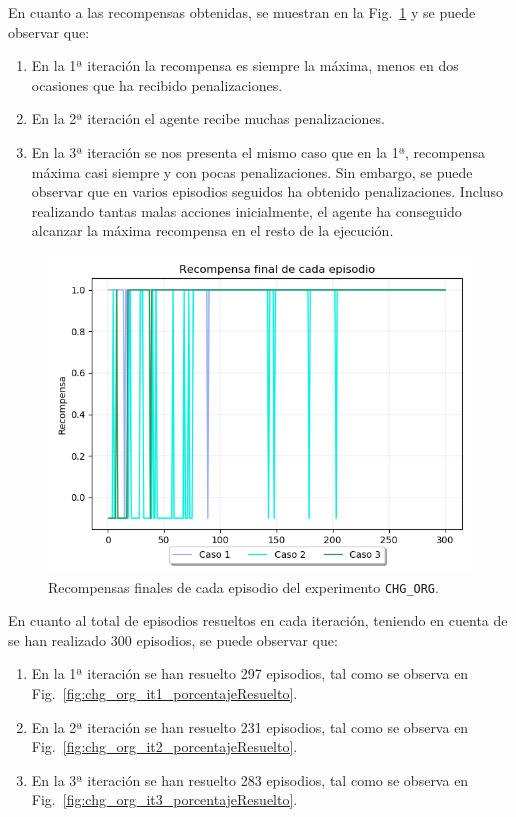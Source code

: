 En cuanto a las recompensas obtenidas, se muestran en la Fig.~\ref{fig:CHANGE_ORIGIN-20-09_00-42-50_recompensa} y se puede observar que: 
\begin{enumerate}
    \item En la 1ª iteración la recompensa es siempre la máxima, menos en dos ocasiones que ha recibido penalizaciones.  
    \item En la 2ª iteración el agente recibe muchas penalizaciones.
    \item En la 3ª iteración se nos presenta el mismo caso que en la 1ª, recompensa máxima casi siempre y con pocas penalizaciones. Sin embargo, se puede observar que en varios episodios seguidos ha obtenido penalizaciones. Incluso realizando tantas malas acciones inicialmente, el agente ha conseguido alcanzar la máxima recompensa en el resto de la ejecución. 
\end{enumerate}

\begin{figure}
    \centering
    \includegraphics[scale=0.4]{cap5_experimentacion/images/CHANGE_ORIGIN-20-09_00-42-50_recompensa.png}
    \caption{Recompensas finales de cada episodio del experimento \texttt{CHG\_ORG}.}
    \label{fig:CHANGE_ORIGIN-20-09_00-42-50_recompensa}
\end{figure}

En cuanto al total de episodios resueltos en cada iteración, teniendo en cuenta de se han realizado 300 episodios, se puede observar que: 
\begin{enumerate}
    \item En la 1ª iteración se han resuelto 297 episodios, tal como se observa en Fig.~\ref{fig:chg_org_it1_porcentajeResuelto}.
    \item En la 2ª iteración se han resuelto 231 episodios, tal como se observa en Fig.~\ref{fig:chg_org_it2_porcentajeResuelto}.
    \item En la 3ª iteración se han resuelto 283 episodios, tal como se observa en Fig.~\ref{fig:chg_org_it3_porcentajeResuelto}.
\end{enumerate}

